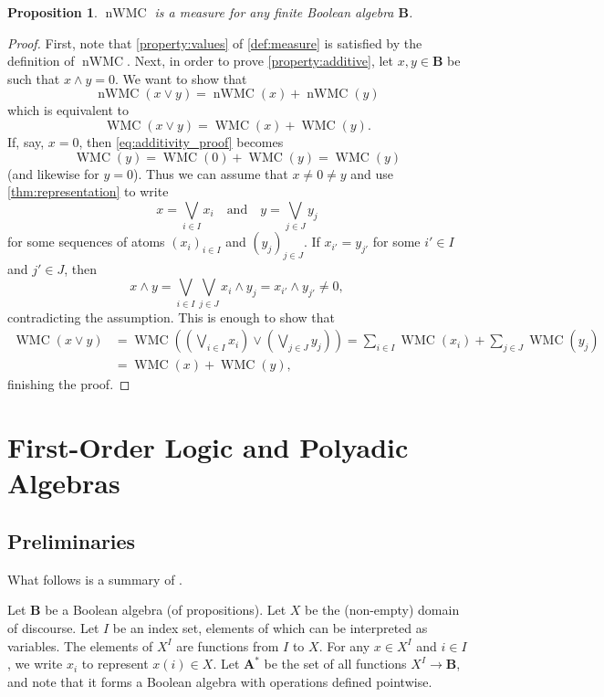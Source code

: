 \documentclass{article}
\newtheorem{proposition}{Proposition}
\theoremstyle{definition}
\theoremstyle{remark}
\DeclareMathOperator{\WMC}{WMC}
\DeclareMathOperator{\nWMC}{nWMC}
\begin{document}
\begin{proposition}
  $\nWMC$ is a measure for any finite Boolean algebra $\mathbf{B}$.
\end{proposition}
\begin{proof}
  First, note that \cref{property:values} of \cref{def:measure} is satisfied by
  the definition of $\nWMC$. Next, in order to prove \cref{property:additive},
  let $x, y \in \mathbf{B}$ be such that $x \land y = 0$. We want to show that
  \[
    \nWMC(x \lor y) = \nWMC(x) + \nWMC(y)
  \]
  which is equivalent to
  \begin{equation} \label{eq:additivity_proof}
    \WMC(x \lor y) = \WMC(x) + \WMC(y).
  \end{equation}
  If, say, $x = 0$, then \cref{eq:additivity_proof} becomes
  \[
    \WMC(y) = \WMC(0) + \WMC(y) = \WMC(y)
  \]
  (and likewise for $y = 0$). Thus we can assume that $x \ne 0 \ne y$ and use
  \cref{thm:representation} to write
  \[
    x = \bigvee_{i \in I} x_i \quad \text{and} \quad y = \bigvee_{j \in J} y_j
  \]
  for some sequences of atoms $(x_i)_{i \in I}$ and $(y_j)_{j \in J}$. If
  $x_{i'} = y_{j'}$ for some $i' \in I$ and $j' \in J$, then
  \[
    x \land y = \bigvee_{i \in I} \bigvee_{j \in J} x_i \land y_j = x_{i'} \land
    y_{j'} \ne 0,
  \]
  contradicting the assumption. This is enough to show that
  \begin{align*}
    \WMC(x \lor y) &= \WMC\left( \left( \bigvee_{i \in I} x_i \right) \lor \left(\bigvee_{j \in J} y_j \right) \right) = \sum_{i \in I} \WMC(x_i) + \sum_{j \in J} \WMC(y_j) \\
                   &= \WMC(x) + \WMC(y),
  \end{align*}
  finishing the proof.
\end{proof}

\section{First-Order Logic and Polyadic Algebras}

\subsection{Preliminaries}

What follows is a summary of \cite{halmos2016algebraic}.

Let $\mathbf{B}$ be a Boolean algebra (of propositions). Let $X$ be the
(non-empty) domain of discourse. Let $I$ be an index set, elements of which can
be interpreted as variables. The elements of $X^I$ are functions from $I$ to
$X$. For any $x \in X^I$ and $i \in I$, we write $x_i$ to represent $x(i) \in
X$. Let $\mathbf{A^*}$ be the set of all functions $X^I \to \mathbf{B}$, and
note that it forms a Boolean algebra with operations defined pointwise.
\end{document}
